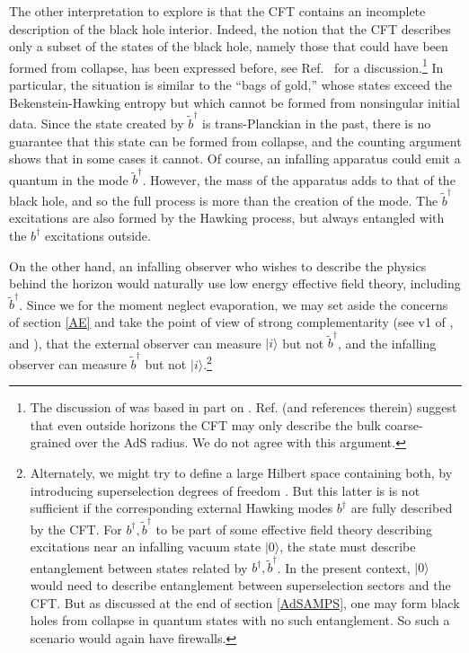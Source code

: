 \documentclass[12pt]{article}
\begin{document}
{The other interpretation to explore is that the CFT contains an incomplete description of the black hole interior.  Indeed, the notion that the CFT describes only a subset of the states of the black hole, namely those that could have been formed from collapse, has been expressed before, see Ref.~\cite{Marolf:2008tx} for a discussion.\footnote{{The discussion of \cite{Marolf:2008tx} was based in part on \cite{Maldacena:2001kr,Freivogel:2005qh}.} {Ref. \cite{Gary:2009mi} (and references therein) suggest that even outside horizons the CFT may only describe the bulk coarse-grained over the AdS radius.  We do not agree with this argument.}}  In particular, the situation is similar to the ``bags of gold,'' whose states exceed the Bekenstein-Hawking entropy but which cannot be formed from nonsingular initial data. Since the state created by $\tilde b^\dagger$ is trans-Planckian in the past, there is no guarantee that this state can be formed from collapse, and the counting argument shows that in some cases it cannot.  Of course, an infalling apparatus could emit a quantum in the mode $\tilde b^\dagger$.  However, the mass of the apparatus adds to that of the black hole, and so the full process is more than the creation of the mode.  The  $\tilde b^\dagger$ excitations are also formed by the Hawking process, but always entangled with the $b^\dagger$ {excitations} outside.

On the other hand, an infalling observer who wishes to describe the physics behind the horizon would naturally use low energy effective field theory, including $\tilde b^\dagger$.  Since we for the moment neglect evaporation, we may set aside the concerns of section \ref{AE} and take the point of view of strong complementarity  {(see v1 of \cite{Bousso:2012as}, and \cite{Harlow:2013tf})}, that the external observer can measure $|i\rangle$ but not $\tilde b^\dagger$, and the infalling observer can measure $\tilde b^\dagger$ but not $|i\rangle$.\footnote{Alternately, we might try to define a large Hilbert space containing both, by introducing superselection degrees of freedom \cite{Marolf:2008tx,Marolf:2012xe}.
But this latter is is not sufficient if the corresponding external Hawking modes $b^\dagger$ are fully described by the CFT.  For $b^\dagger, \tilde b^\dagger$ to be part of some effective field theory describing excitations near an infalling vacuum state $|0\rangle$, the state must describe entanglement between states related by $b^\dagger, \tilde b^\dagger$.  In the present context,
$|0\rangle$ would need to describe entanglement between superselection sectors and the CFT.  But as discussed at the end of section \ref{AdSAMPS}, one may form black holes {from collapse} in quantum states with no such entanglement.  So such a scenario would again have firewalls.}

}
\end{document}
